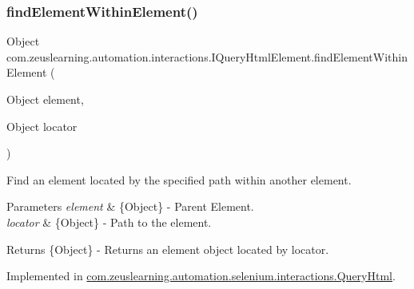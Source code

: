 \hypertarget{interfacecom_1_1zeuslearning_1_1automation_1_1interactions_1_1IQueryHtmlElement_aa851cf42225ccecd3055ee8b2b2efe05}{}\label{interfacecom_1_1zeuslearning_1_1automation_1_1interactions_1_1IQueryHtmlElement_aa851cf42225ccecd3055ee8b2b2efe05} 
\subsubsection{\texorpdfstring{find\+Element\+Within\+Element()}{findElementWithinElement()}}
{\footnotesize\ttfamily Object com.\+zeuslearning.\+automation.\+interactions.\+I\+Query\+Html\+Element.\+find\+Element\+Within\+Element (\begin{DoxyParamCaption}\item[{Object}]{element,  }\item[{Object}]{locator }\end{DoxyParamCaption})}

Find an element located by the specified path within another element.


\begin{DoxyParams}{Parameters}
{\em element} & \{Object\} -\/ Parent Element.\\
\hline
{\em locator} & \{Object\} -\/ Path to the element. \\
\hline
\end{DoxyParams}
\begin{DoxyReturn}{Returns}
\{Object\} -\/ Returns an element object located by {\ttfamily locator}. 
\end{DoxyReturn}


Implemented in \hyperlink{classcom_1_1zeuslearning_1_1automation_1_1selenium_1_1interactions_1_1QueryHtml_ae9f39730724b96bc25230b5c5b55dec1}{com.\+zeuslearning.\+automation.\+selenium.\+interactions.\+Query\+Html}.

\hypertarget{interfacecom_1_1zeuslearning_1_1automation_1_1interactions_1_1IQueryHtmlElement_acd3892f7d74e247cf76dd5360fc7df49}{}\label{interfacecom_1_1zeuslearning_1_1automation_1_1interactions_1_1IQueryHtmlElement_acd3892f7d74e247cf76dd5360fc7df49} 
